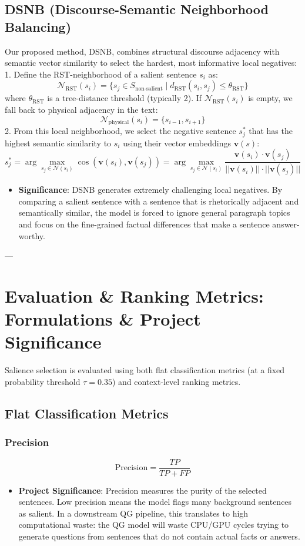 \documentclass[11pt,a4paper]{article}
\begin{document}
\subsection{DSNB (Discourse-Semantic Neighborhood Balancing)}
Our proposed method, DSNB, combines structural discourse adjacency with semantic vector similarity to select the hardest, most informative local negatives:
1. Define the RST-neighborhood of a salient sentence $s_i$ as:
\[
\mathcal{N}_{\text{RST}}(s_i) = \{s_j \in S_{\text{non-salient}} \mid d_{\text{RST}}(s_i, s_j) \le \theta_{\text{RST}}\}
\]
where $\theta_{\text{RST}}$ is a tree-distance threshold (typically 2). If $\mathcal{N}_{\text{RST}}(s_i)$ is empty, we fall back to physical adjacency in the text:
\[
\mathcal{N}_{\text{physical}}(s_i) = \{s_{i-1}, s_{i+1}\}
\]
2. From this local neighborhood, we select the negative sentence $s_j^*$ that has the highest semantic similarity to $s_i$ using their vector embeddings $\mathbf{v}(s)$:
\[
s_j^* = \arg\max_{s_j \in \mathcal{N}(s_i)} \cos\left( \mathbf{v}(s_i), \mathbf{v}(s_j) \right) = \arg\max_{s_j \in \mathcal{N}(s_i)} \frac{\mathbf{v}(s_i) \cdot \mathbf{v}(s_j)}{||\mathbf{v}(s_i)|| \cdot ||\mathbf{v}(s_j)||}
\]
\begin{itemize}
    \item \textbf{Significance}: DSNB generates extremely challenging local negatives. By comparing a salient sentence with a sentence that is rhetorically adjacent and semantically similar, the model is forced to ignore general paragraph topics and focus on the fine-grained factual differences that make a sentence answer-worthy.
\end{itemize}

---

\section{Evaluation \& Ranking Metrics: Formulations \& Project Significance}

Salience selection is evaluated using both flat classification metrics (at a fixed probability threshold $\tau = 0.35$) and context-level ranking metrics.

\subsection{Flat Classification Metrics}

\subsubsection{Precision}
\[
\text{Precision} = \frac{TP}{TP + FP}
\]
\begin{itemize}
    \item \textbf{Project Significance}: Precision measures the purity of the selected sentences. Low precision means the model flags many background sentences as salient. In a downstream QG pipeline, this translates to high computational waste: the QG model will waste CPU/GPU cycles trying to generate questions from sentences that do not contain actual facts or answers.
\end{itemize}
\end{document}
